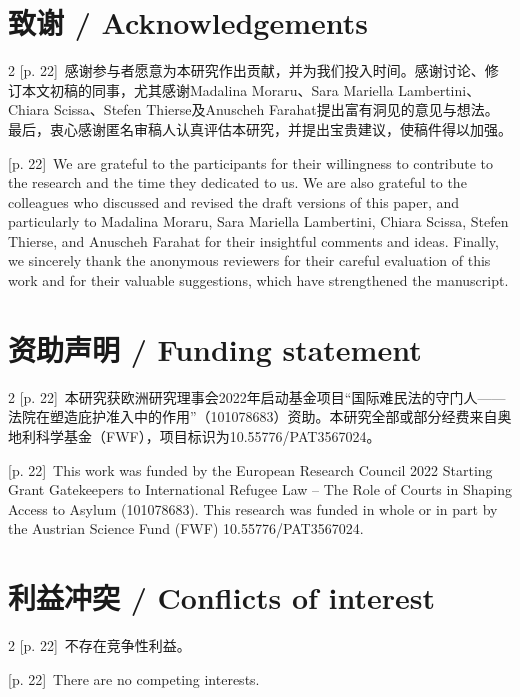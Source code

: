 \documentclass[10pt,a4paper]{article}
\begin{document}
\section*{致谢 / Acknowledgements}
\begin{paracol}{2}
{\scriptsize\color{gray} [p. 22]}\ 感谢参与者愿意为本研究作出贡献，并为我们投入时间。感谢讨论、修订本文初稿的同事，尤其感谢Madalina Moraru、Sara Mariella Lambertini、Chiara Scissa、Stefen Thierse及Anuscheh Farahat提出富有洞见的意见与想法。最后，衷心感谢匿名审稿人认真评估本研究，并提出宝贵建议，使稿件得以加强。\par
\switchcolumn
{\scriptsize\color{gray} [p. 22]}\ We are grateful to the participants for their willingness to contribute to the research and the time they dedicated to us. We are also grateful to the colleagues who discussed and revised the draft versions of this paper, and particularly to Madalina Moraru, Sara Mariella Lambertini, Chiara Scissa, Stefen Thierse, and Anuscheh Farahat for their insightful comments and ideas. Finally, we sincerely thank the anonymous reviewers for their careful evaluation of this work and for their valuable suggestions, which have strengthened the manuscript.\par
\switchcolumn*
\end{paracol}
\section*{资助声明 / Funding statement}
\begin{paracol}{2}
{\scriptsize\color{gray} [p. 22]}\ 本研究获欧洲研究理事会2022年启动基金项目“国际难民法的守门人——法院在塑造庇护准入中的作用”（101078683）资助。本研究全部或部分经费来自奥地利科学基金（FWF），项目标识为10.55776/PAT3567024。\par
\switchcolumn
{\scriptsize\color{gray} [p. 22]}\ This work was funded by the European Research Council 2022 Starting Grant Gatekeepers to International Refugee Law – The Role of Courts in Shaping Access to Asylum (101078683). This research was funded in whole or in part by the Austrian Science Fund (FWF) 10.55776/PAT3567024.\par
\switchcolumn*
\end{paracol}
\section*{利益冲突 / Conflicts of interest}
\begin{paracol}{2}
{\scriptsize\color{gray} [p. 22]}\ 不存在竞争性利益。\par
\switchcolumn
{\scriptsize\color{gray} [p. 22]}\ There are no competing interests.\par
\switchcolumn*
\end{paracol}
\end{document}
